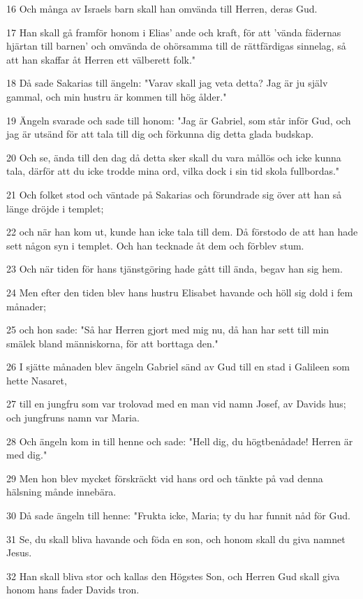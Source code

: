 \par 16 Och många av Israels barn skall han omvända till Herren, deras Gud.
\par 17 Han skall gå framför honom i Elias' ande och kraft, för att 'vända fädernas hjärtan till barnen' och omvända de ohörsamma till de rättfärdigas sinnelag, så att han skaffar åt Herren ett välberett folk."
\par 18 Då sade Sakarias till ängeln: "Varav skall jag veta detta? Jag är ju själv gammal, och min hustru är kommen till hög ålder."
\par 19 Ängeln svarade och sade till honom: "Jag är Gabriel, som står inför Gud, och jag är utsänd för att tala till dig och förkunna dig detta glada budskap.
\par 20 Och se, ända till den dag då detta sker skall du vara mållös och icke kunna tala, därför att du icke trodde mina ord, vilka dock i sin tid skola fullbordas."
\par 21 Och folket stod och väntade på Sakarias och förundrade sig över att han så länge dröjde i templet;
\par 22 och när han kom ut, kunde han icke tala till dem. Då förstodo de att han hade sett någon syn i templet. Och han tecknade åt dem och förblev stum.
\par 23 Och när tiden för hans tjänstgöring hade gått till ända, begav han sig hem.
\par 24 Men efter den tiden blev hans hustru Elisabet havande och höll sig dold i fem månader;
\par 25 och hon sade: "Så har Herren gjort med mig nu, då han har sett till min smälek bland människorna, för att borttaga den."
\par 26 I sjätte månaden blev ängeln Gabriel sänd av Gud till en stad i Galileen som hette Nasaret,
\par 27 till en jungfru som var trolovad med en man vid namn Josef, av Davids hus; och jungfruns namn var Maria.
\par 28 Och ängeln kom in till henne och sade: "Hell dig, du högtbenådade! Herren är med dig."
\par 29 Men hon blev mycket förskräckt vid hans ord och tänkte på vad denna hälsning månde innebära.
\par 30 Då sade ängeln till henne: "Frukta icke, Maria; ty du har funnit nåd för Gud.
\par 31 Se, du skall bliva havande och föda en son, och honom skall du giva namnet Jesus.
\par 32 Han skall bliva stor och kallas den Högstes Son, och Herren Gud skall giva honom hans fader Davids tron.
